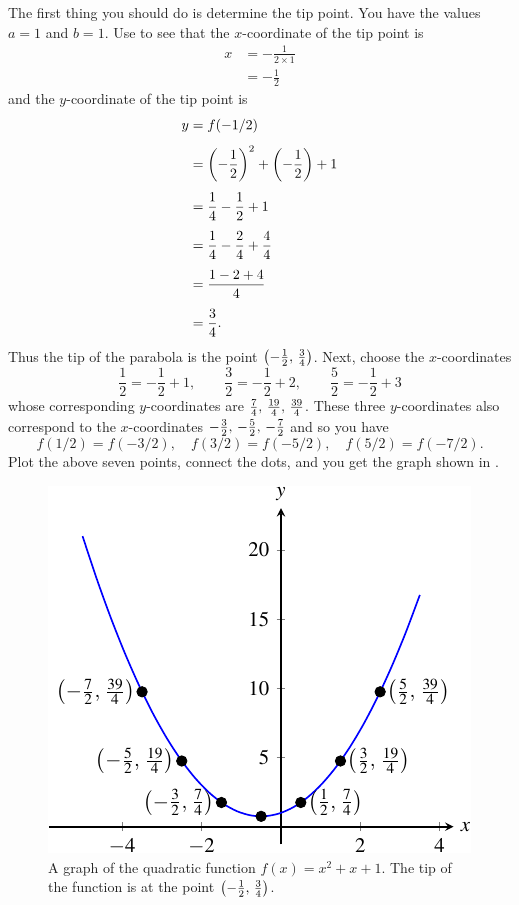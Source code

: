 \documentclass[a4paper,oneside,12pt]{article}
\begin{document}
\begin{solution}
The first thing you should do is determine the tip point.  You have
the values $a = 1$ and $b = 1$.  Use
 to see that the
$x$-coordinate of the tip point is
\begin{align*}
x
&=
-\frac{1}{2 \times 1} \\[4pt]
&=
-\frac{1}{2}
\end{align*}
and the $y$-coordinate of the tip point is
\begin{align*}
y
&=
f(-1/2) \\[4pt]
&=
\parenthesis*{-\frac{1}{2}}^2 + \parenthesis*{-\frac{1}{2}} + 1 \\[4pt]
&=
\frac{1}{4} - \frac{1}{2} + 1 \\[4pt]
&=
\frac{1}{4} - \frac{2}{4} + \frac{4}{4} \\[4pt]
&=
\frac{1 - 2 + 4}{4} \\[4pt]
&=
\frac{3}{4}.
\end{align*}
Thus the tip of the parabola is the point
$\tuple{-\frac{1}{2}}{\frac{3}{4}}$.  Next, choose the $x$-coordinates
\begin{equation}
\label{eqn:a1_b1_c1_x_coordinates}
\frac{1}{2} = -\frac{1}{2} + 1,
\qquad
\frac{3}{2} = -\frac{1}{2} + 2,
\qquad
\frac{5}{2} = -\frac{1}{2} + 3
\end{equation}
whose corresponding $y$-coordinates are
$\triple{\frac{7}{4}}{\frac{19}{4}}{\frac{39}{4}}$.  These three
$y$-coordinates also correspond to the $x$-coordinates
$\triple{-\frac{3}{2}}{-\frac{5}{2}}{-\frac{7}{2}}$ and so you have
\[
f(1/2) = f(-3/2),
\quad
f(3/2) = f(-5/2),
\quad
f(5/2) = f(-7/2).
\]
Plot the above seven points, connect the dots, and you get the graph
shown in .
\end{solution}

\begin{figure}[!htbp]
\centering
\includegraphics[scale=1.2]{image/07/a1-b1-c1.pdf}
\caption{%
  A graph of the quadratic function $f(x) = x^2 + x + 1$.  The tip of
  the function is at the point $\tuple{-\frac{1}{2}}{\frac{3}{4}}$.
}
\label{fig:quadratic_graph_a1_b1_c1}
\end{figure}
\end{document}
